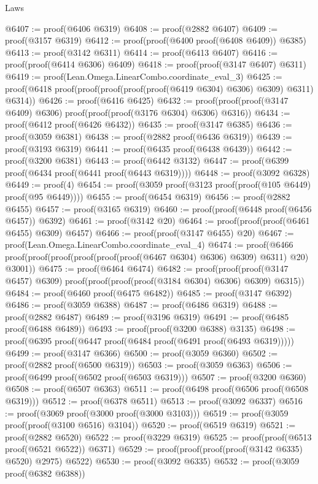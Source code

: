 \begin{lexlean}{Laws}
\begin{coremodule}
@6407 := proof(@6406 @6319)
@6408 := proof(@2882 @6407)
@6409 := proof(@3157 @6319)
@6412 := proof(proof(@6400 proof(@6408 @6409)) @6385)
@6413 := proof(@3142 @6311)
@6414 := proof(@6413 @6407)
@6416 := proof(proof(@6414 @6306) @6409)
@6418 := proof(proof(@3147 @6407) @6311)
@6419 := proof(Lean.Omega.LinearCombo.coordinate_eval_3)
@6425 := proof(@6418 proof(proof(proof(proof(proof(@6419 @6304) @6306) @6309) @6311) @6314))
@6426 := proof(@6416 @6425)
@6432 := proof(proof(proof(@3147 @6409) @6306) proof(proof(proof(@3176 @6304) @6306) @6316))
@6434 := proof(@6412 proof(@6426 @6432))
@6435 := proof(@3147 @6385)
@6436 := proof(@3059 @6381)
@6438 := proof(@2882 proof(@6436 @6319))
@6439 := proof(@3193 @6319)
@6441 := proof(@6435 proof(@6438 @6439))
@6442 := proof(@3200 @6381)
@6443 := proof(@6442 @3132)
@6447 := proof(@6399 proof(@6434 proof(@6441 proof(@6443 @6319))))
@6448 := proof(@3092 @6328)
@6449 := proof(4)
@6454 := proof(@3059 proof(@3123 proof(proof(@105 @6449) proof(@95 @6449))))
@6455 := proof(@6454 @6319)
@6456 := proof(@2882 @6455)
@6457 := proof(@3165 @6319)
@6460 := proof(proof(@6448 proof(@6456 @6457)) @6392)
@6461 := proof(@3142 @20)
@6464 := proof(proof(proof(@6461 @6455) @6309) @6457)
@6466 := proof(proof(@3147 @6455) @20)
@6467 := proof(Lean.Omega.LinearCombo.coordinate_eval_4)
@6474 := proof(@6466
      proof(proof(proof(proof(proof(proof(@6467 @6304) @6306) @6309) @6311) @20) @3001))
@6475 := proof(@6464 @6474)
@6482 := proof(proof(proof(@3147 @6457) @6309)
      proof(proof(proof(proof(@3184 @6304) @6306) @6309) @6315))
@6484 := proof(@6460 proof(@6475 @6482))
@6485 := proof(@3147 @6392)
@6486 := proof(@3059 @6388)
@6487 := proof(@6486 @6319)
@6488 := proof(@2882 @6487)
@6489 := proof(@3196 @6319)
@6491 := proof(@6485 proof(@6488 @6489))
@6493 := proof(proof(@3200 @6388) @3135)
@6498 := proof(@6395 proof(@6447 proof(@6484 proof(@6491 proof(@6493 @6319)))))
@6499 := proof(@3147 @6366)
@6500 := proof(@3059 @6360)
@6502 := proof(@2882 proof(@6500 @6319))
@6503 := proof(@3059 @6363)
@6506 := proof(@6499 proof(@6502 proof(@6503 @6319)))
@6507 := proof(@3200 @6360)
@6508 := proof(@6507 @6363)
@6511 := proof(@6498 proof(@6506 proof(@6508 @6319)))
@6512 := proof(@6378 @6511)
@6513 := proof(@3092 @6337)
@6516 := proof(@3069 proof(@3000 proof(@3000 @3103)))
@6519 := proof(@3059 proof(proof(@3100 @6516) @3104))
@6520 := proof(@6519 @6319)
@6521 := proof(@2882 @6520)
@6522 := proof(@3229 @6319)
@6525 := proof(proof(@6513 proof(@6521 @6522)) @6371)
@6529 := proof(proof(proof(proof(@3142 @6335) @6520) @2975) @6522)
@6530 := proof(@3092 @6335)
@6532 := proof(@3059 proof(@6382 @6388))

\end{coremodule}
\end{lexlean}
